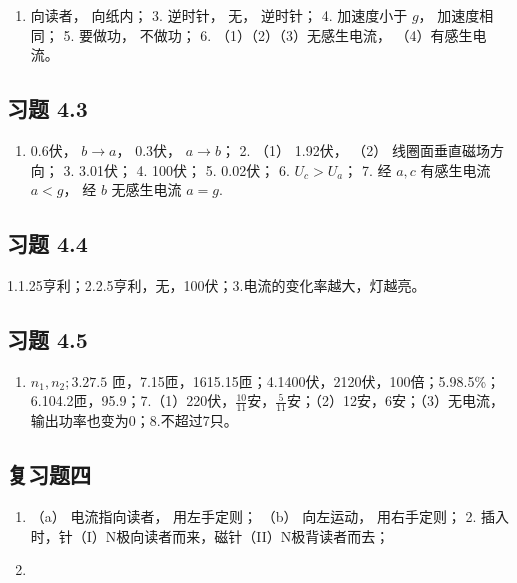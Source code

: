 \begin{enumerate}
\def\labelenumi{\arabic{enumi}.}
\tightlist
\item
  向读者， 向纸内； 3. 逆时针， 无， 逆时针； 4. 加速度小于 \(g\)，
  加速度相同； 5. 要做功， 不做功； 6. （1）（2）（3）无感生电流，
  （4）有感生电流。
\end{enumerate}

\subsection{习题 4.3}\label{ux4e60ux9898-4.3-1}

\begin{enumerate}
\def\labelenumi{\arabic{enumi}.}
\tightlist
\item
  0.6伏， \(b \to a\)， 0.3伏， \(a \to b\)； 2. （1） 1.92伏， （2）
  线圈面垂直磁场方向； 3. 3.01伏； 4. 100伏； 5. 0.02伏； 6.
  \(U_{c} > U_{a}\)； 7. 经 \(a, c\) 有感生电流 \(a < g\)， 经 \(b\)
  无感生电流 \(a = g\).
\end{enumerate}

\subsection{习题 4.4}\label{ux4e60ux9898-4.4-1}

1.1.25亨利；2.2.5亨利，无，100伏；3.电流的变化率越大，灯越亮。

\subsection{习题 4.5}\label{ux4e60ux9898-4.5-1}

\begin{enumerate}
\def\labelenumi{\arabic{enumi}.}
\setcounter{enumi}{1}
\tightlist
\item
  \(n_1, n_2; 3.27.5\)
  匝，7.15匝，1615.15匝；4.1400伏，2120伏，100倍；5.98.5\%；6.104.2匝，95.9；7.（1）220伏，\(\frac{10}{11}\)安，\(\frac{5}{11}\)安；（2）12安，6安；（3）无电流，输出功率也变为0；8.不超过7只。
\end{enumerate}

\subsection{复习题四}\label{ux590dux4e60ux9898ux56db-1}

\begin{enumerate}
\def\labelenumi{\arabic{enumi}.}
\item
  （a） 电流指向读者， 用左手定则； （b） 向左运动， 用右手定则； 2.
  插入时，针（I）N极向读者而来，磁针（II）N极背读者而去；
\item
\end{enumerate}

